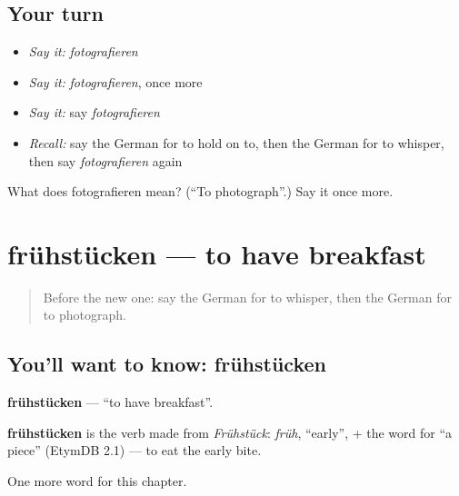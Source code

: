 \subsection*{Your turn}
\begin{itemize}
\raggedright
  \item \emph{Say it:} \emph{fotografieren}
  \item \emph{Say it:} \emph{fotografieren}, once more
  \item \emph{Say it:} say \emph{fotografieren}
  \item \emph{Recall:} say the German for to hold on to, then the German for to whisper, then say \emph{fotografieren} again
\end{itemize}

\begin{tcolorbox}[breakable,colback=teal!4,colframe=teal!35!black,title={Before you move on}]
What does fotografieren mean? (\textquotedblleft{}To photograph\textquotedblright{}.) Say it once more.
\end{tcolorbox}
\section[frühstücken]{frühstücken — to have breakfast}

\label{lesson:GE-C181-fruehstuecken}



\begin{quote}
Before the new one: say the German for to whisper, then the German for to photograph.
\end{quote}

\subsection*{You'll want to know: frühstücken}
\textbf{frühstücken} — \textquotedblleft{}to have breakfast\textquotedblright{}.

\begin{cousinweb}
\textbf{frühstücken} is the verb made from \emph{Frühstück}: \emph{früh}, \textquotedblleft{}early\textquotedblright{}, + the word for \textquotedblleft{}a piece\textquotedblright{} (EtymDB 2.1) — to eat the early bite.
\end{cousinweb}

\begin{grammarlens}[title={What you've built}]
One more word for this chapter.
\end{grammarlens}

